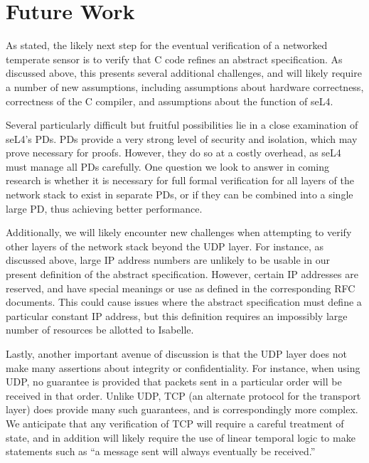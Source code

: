 \documentclass[twoside]{memoir}
\begin{document}
\chapter{Future Work}
As stated, the likely next step for the eventual verification of a networked temperate sensor
is to verify that C code refines an abstract specification.
As discussed above, this presents several additional challenges, and will
likely require a number of new assumptions, including assumptions about
hardware correctness, correctness of the C compiler, and assumptions about the function of seL4.

Several particularly difficult but fruitful possibilities lie in a close examination of
seL4's PDs.
PDs provide a very strong level of security and isolation, which may prove necessary for proofs.
However, they do so at a costly overhead, as seL4 must manage all PDs carefully.
One question we look to answer in coming research is whether it is necessary
for full formal verification for all layers of the network stack to exist in separate PDs,
or if they can be combined into a single large PD, thus achieving better performance.

Additionally, we will likely encounter new challenges when attempting to verify
other layers of the network stack beyond the UDP layer.
For instance, as discussed above, large IP address numbers are unlikely to be usable
in our present definition of the abstract specification.
However, certain IP addresses are reserved, and have special meanings or use as defined in
the corresponding RFC documents.
This could cause issues where the abstract specification must define a particular constant
IP address, but this definition requires an impossibly large number of resources be allotted to
Isabelle.

Lastly, another important avenue of discussion is that the UDP layer does not make many assertions about integrity or confidentiality.
For instance, when using UDP, no guarantee is provided that packets sent in a particular order
will be received in that order.
Unlike UDP, TCP (an alternate protocol for the transport layer) does provide many such guarantees,
and is correspondingly more complex. We anticipate that any verification of TCP will require
a careful treatment of state, and in addition will likely require the use of linear temporal logic
to make statements such as ``a message sent will always eventually be received.''





\appendix
\end{document}

